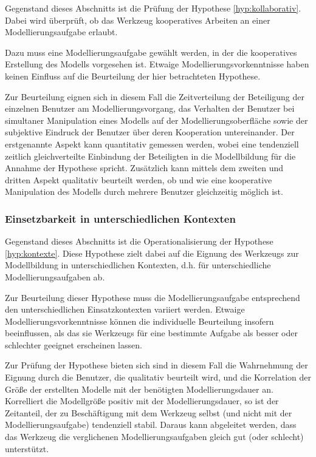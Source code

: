 Gegenstand dieses Abschnitts ist die Prüfung der Hypothese \ref{hyp:kollaborativ}. Dabei wird überprüft, ob das Werkzeug kooperatives Arbeiten an einer Modellierungsaufgabe erlaubt.

Dazu muss eine Modellierungsaufgabe gewählt werden, in der die kooperatives Erstellung des Modells vorgesehen ist. Etwaige Modellierungsvorkenntnisse haben keinen Einfluss auf die Beurteilung der hier betrachteten Hypothese.

Zur Beurteilung eignen sich in diesem Fall die Zeitverteilung der Beteiligung der einzelnen Benutzer am Modellierungsvorgang, das Verhalten der Benutzer bei simultaner Manipulation eines Modells auf der Modellierungsoberfläche sowie der subjektive Eindruck der Benutzer über deren Kooperation untereinander. Der erstgenannte Aspekt kann quantitativ gemessen werden, wobei eine tendenziell zeitlich gleichverteilte Einbindung der Beteiligten in die Modellbildung für die Annahme der Hypothese spricht. Zusätzlich kann mittels dem zweiten und dritten Aspekt qualitativ beurteilt werden, ob und wie eine kooperative Manipulation des Modells durch mehrere Benutzer gleichzeitig möglich ist.


\subsubsection{Einsetzbarkeit in unterschiedlichen Kontexten} %
\label{ssub:einsetzbarkeit_in_unterschiedlichen_kontexten}

Gegenstand dieses Abschnitts ist die Operationalisierung der Hypothese \ref{hyp:kontexte}. Diese Hypothese zielt dabei auf die Eignung des Werkzeugs zur Modellbildung in unterschiedlichen Kontexten, d.h. für unterschiedliche Modellierungsaufgaben ab. 

Zur Beurteilung dieser Hypothese muss die Modellierungsaufgabe entsprechend den unterschiedlichen Einsatzkontexten variiert werden. Etwaige Modellierungsvorkenntnisse können die individuelle Beurteilung insofern beeinflussen, als das sie Werkzeugs für eine bestimmte Aufgabe als besser oder schlechter geeignet erscheinen lassen.

Zur Prüfung der Hypothese bieten sich sind in diesem Fall die Wahrnehmung der Eignung durch die Benutzer, die qualitativ beurteilt wird, und die Korrelation der Größe der erstellten Modelle mit der benötigten Modellierungsdauer an. Korrelliert die Modellgröße positiv mit der Modellierungsdauer, so ist der Zeitanteil, der zu Beschäftigung mit dem Werkzeug selbst (und nicht mit der Modellierungsaufgabe) tendenziell stabil. Daraus kann abgeleitet werden, dass das Werkzeug die verglichenen Modellierungsaufgaben gleich gut (oder schlecht) unterstützt.

